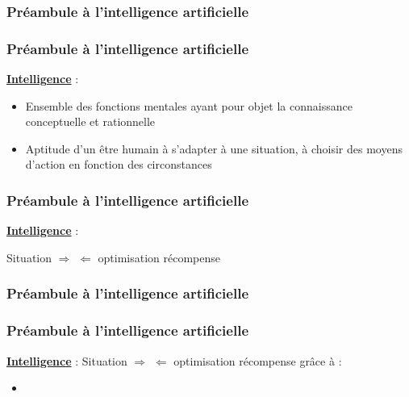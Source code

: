 \begin{frame}
  \frametitle{Préambule à l'intelligence artificielle}
  \begin{center}
    \huge{}
  \end{center}
\end{frame}

\begin{frame}
  \frametitle{Préambule à l'intelligence artificielle}
  \underline{\textbf{Intelligence}} :
  \begin{itemize}
  \item Ensemble des fonctions mentales ayant pour objet la connaissance conceptuelle et rationnelle
  \item Aptitude d'un être humain à s'adapter à une situation, à choisir des moyens d'action en fonction des circonstances
  \end{itemize}
  \pause
  \begin{center}
  \end{center}
\end{frame}

\begin{frame}
  \frametitle{Préambule à l'intelligence artificielle}
  \underline{\textbf{Intelligence}} :
  \newline
  \newline
  \begin{center}
    Situation $\Rightarrow$  $\Leftarrow$ optimisation récompense
    \pause
    \newline
    \newline
  \end{center}
\end{frame}

\begin{frame}
  \frametitle{Préambule à l'intelligence artificielle}
\end{frame}

\begin{frame}
  \frametitle{Préambule à l'intelligence artificielle}
  \underline{\textbf{Intelligence}} :
  \newline
  \newline
  Situation $\Rightarrow$  $\Leftarrow$ optimisation récompense
  \newline
  \newline
  grâce à :
  \begin{itemize}
  \item {}
  \end{itemize}
\end{frame}

